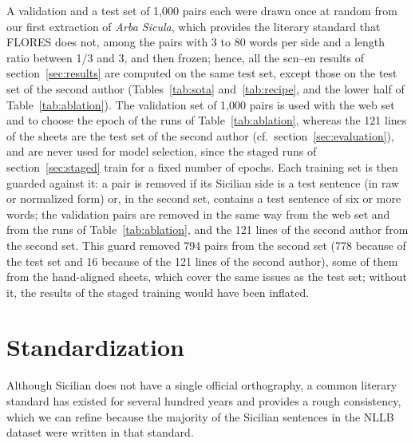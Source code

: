 \documentclass[11pt,a4paper]{article}
\begin{document}
A validation and a test set of 1{,}000 pairs each were drawn once at random from our first extraction of \emph{Arba Sicula}, which provides the literary standard that FLORES does not, among the pairs with 3 to 80 words per side and a length ratio between 1/3 and 3, and then frozen; hence, all the scn--en results of section~\ref{sec:results} are computed on the same test set, except those on the test set of the second author (Tables~\ref{tab:sota} and~\ref{tab:recipe}, and the lower half of Table~\ref{tab:ablation}). The validation set of 1{,}000 pairs is used with the web set and to choose the epoch of the runs of Table~\ref{tab:ablation}, whereas the 121 lines of the sheets are the test set of the second author (cf.\ section~\ref{sec:evaluation}), and are never used for model selection, since the staged runs of section~\ref{sec:staged} train for a fixed number of epochs.
Each training set is then guarded against it: a pair is removed if its Sicilian side is a test
sentence (in raw or normalized form) or, in the second set, contains a test sentence of six or more
words; the validation pairs are removed in the same way from the web set and from the runs of Table~\ref{tab:ablation}, and the 121 lines of the second author from the second set. This guard removed 794 pairs from the second set (778 because of the test set and 16 because of the 121 lines of the second author), some of them from the hand-aligned sheets, which cover the same issues as the test set; without it, the results of the staged training would have been inflated.






\section{Standardization}
\label{sec:standardization}
Although Sicilian does not have a single official orthography,
a common literary standard has existed for several hundred years
and provides a rough consistency, which we can refine
because the majority of the Sicilian sentences
in the NLLB dataset were written in that standard.
\end{document}
